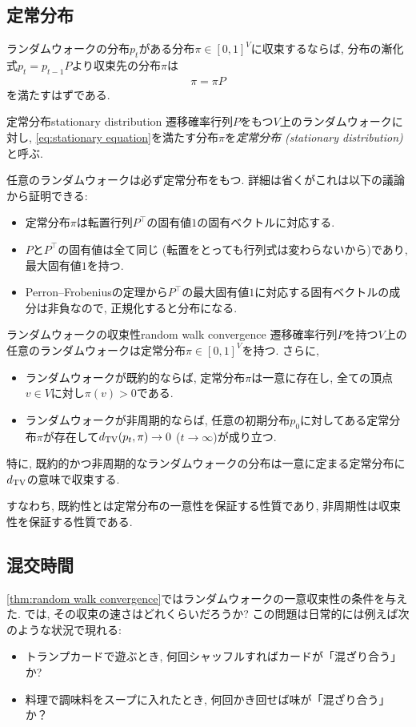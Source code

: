 \subsection{定常分布}
ランダムウォークの分布$p_t$がある分布$\pi\in[0,1]^V$に収束するならば, 分布の漸化式$p_t = p_{t-1}P$より収束先の分布$\pi$は
\begin{align}
  \pi = \pi P \label{eq:stationary equation}
\end{align}
を満たすはずである.
%
\begin{definition}{定常分布}{stationary distribution}
  遷移確率行列$P$をもつ$V$上のランダムウォークに対し, \cref{eq:stationary equation}を満たす分布$\pi$を\emph{定常分布 (stationary distribution)}と呼ぶ.
\end{definition}
%
任意のランダムウォークは必ず定常分布をもつ.
詳細は省くがこれは以下の議論から証明できる:
\begin{itemize}
  \item 定常分布$\pi$は転置行列$P^{\top}$の固有値$1$の固有ベクトルに対応する.
  \item $P$と$P^\top$の固有値は全て同じ (転置をとっても行列式は変わらないから)であり, 最大固有値$1$を持つ.
  \item Perron--Frobeniusの定理から$P^\top$の最大固有値$1$に対応する固有ベクトルの成分は非負なので, 正規化すると分布になる.
\end{itemize}
%
%
\begin{theorem}{ランダムウォークの収束性}{random walk convergence}
  遷移確率行列$P$を持つ$V$上の任意のランダムウォークは定常分布$\pi \in [0,1]^V$を持つ.
  さらに,
  \begin{itemize}
    \item ランダムウォークが既約的ならば, 定常分布$\pi$は一意に存在し, 全ての頂点$v\in V$に対し$\pi(v)>0$である.
    \item ランダムウォークが非周期的ならば, 任意の初期分布$p_0$に対してある定常分布$\pi$が存在して$d_{\mathrm{TV}}(p_t,\pi)\to 0$ ($t\to\infty$)が成り立つ.
  \end{itemize}

  特に, 既約的かつ非周期的なランダムウォークの分布は一意に定まる定常分布に$d_{\mathrm{TV}}$の意味で収束する.
\end{theorem}
すなわち, 既約性とは定常分布の一意性を保証する性質であり,
非周期性は収束性を保証する性質である.

\subsection{混交時間}
\cref{thm:random walk convergence}ではランダムウォークの一意収束性の条件を与えた.
では, その収束の速さはどれくらいだろうか?
この問題は日常的には例えば次のような状況で現れる:
\begin{itemize}
  \item トランプカードで遊ぶとき, 何回シャッフルすればカードが「混ざり合う」か?
  \item 料理で調味料をスープに入れたとき, 何回かき回せば味が「混ざり合う」か？
\end{itemize}

